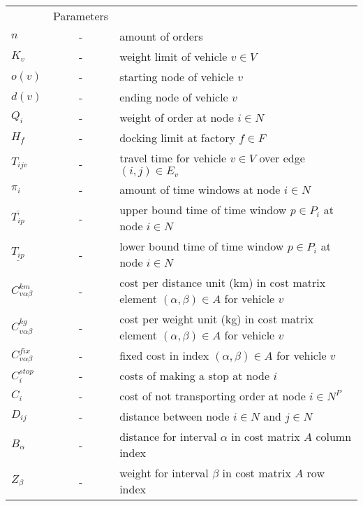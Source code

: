 \documentclass[a4paper,10pt]{article}
\begin{document}
\begin{tabular}{l c l }
    			        &Parameters 							\\ 
    $n    	            $   &-& amount of orders     					\\
    $K_v  	            $   &-& weight limit of vehicle $v\in V$	 			\\
    $o(v)                   $   &-& starting node of vehicle $v$                                \\
    $d(v)                   $   &-& ending node of vehicle $v$                                  \\
    $Q_i  	            $	&-& weight of order at node $i\in N$				\\
    $H_f  	            $	&-& docking limit at factory $f\in F$				\\
    $T_{ijv}                $ 	&-& travel time for vehicle $v\in V$ over edge $(i,j)\in E_v$	\\
    $\pi_i	            $	&-& amount of time windows at node $i\in N$			\\ 
    $\overline{T_{ip}}      $   &-& upper bound time of time window $p\in P_i$ at node $i\in N$ \\
    $\underline{T_{ip}}     $	&-& lower bound time of time window $p\in P_i$ at node $i\in N$ \\
    $C^{km}_{v\alpha\beta}  $	&-& cost per distance unit (km) in cost matrix element 
                                    $(\alpha, \beta) \in A$ for vehicle $v$	                        \\
    $C^{kg}_{v\alpha\beta}  $	&-& cost per weight unit (kg) in cost matrix element 
                                    $(\alpha, \beta) \in A$ for vehicle $v$	                        \\
    $C^{fix}_{v\alpha\beta}  $	&-& fixed cost in index $(\alpha, \beta) \in A$ for vehicle $v$	\\
    $C^{stop}_i             $   &-& costs of making a stop at node $i$ 	                        \\
    $C_i	            $   &-& cost of not transporting order at node $i\in N^P$ 		\\
    $D_{ij}	            $   &-& distance between node $i\in N$ and  $j\in N$		\\
    $B_\alpha               $   &-& distance for interval $\alpha$ in cost matrix $A$ column index\\
    $Z_\beta                $   &-& weight for interval $\beta$ in cost matrix $A$ row index    \\ 
\end{tabular}
\end{document}
